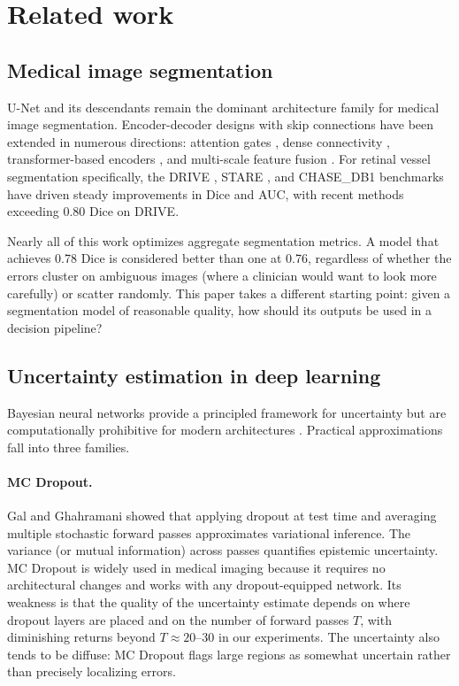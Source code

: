 \section{Related work}
\label{sec:related_work}

\subsection{Medical image segmentation}

U-Net \citep{ronneberger2015unet} and its descendants remain the dominant
architecture family for medical image segmentation. Encoder-decoder designs
with skip connections have been extended in numerous directions: attention
gates \citep{oktay2018attention}, dense connectivity \citep{li2018hdenseunet},
transformer-based encoders \citep{chen2021transunet}, and multi-scale feature
fusion \citep{zhou2018unetplusplus}. For retinal vessel segmentation
specifically, the DRIVE \citep{staal2004drive}, STARE \citep{hoover2000stare},
and CHASE\_DB1 \citep{fraz2012chase} benchmarks have driven steady
improvements in Dice and AUC, with recent methods exceeding 0.80 Dice on DRIVE.

Nearly all of this work optimizes aggregate segmentation metrics. A model
that achieves 0.78 Dice is considered better than one at 0.76, regardless of
whether the errors cluster on ambiguous images (where a clinician would want
to look more carefully) or scatter randomly. This paper takes a different
starting point: given a segmentation model of reasonable quality, how should
its outputs be used in a decision pipeline?

\subsection{Uncertainty estimation in deep learning}

Bayesian neural networks provide a principled framework for uncertainty but are
computationally prohibitive for modern architectures \citep{neal1996bayesian,
blundell2015weight}. Practical approximations fall into three families.

\paragraph{MC Dropout.} Gal and Ghahramani \citep{gal2016dropout} showed that
applying dropout at test time and averaging multiple stochastic forward passes
approximates variational inference. The variance (or mutual information) across
passes quantifies epistemic uncertainty. MC Dropout is widely used in medical
imaging \citep{nair2020exploring,jungo2018effect,roy2019bayesian} because it
requires no architectural changes and works with any dropout-equipped network.
Its weakness is that the quality of the uncertainty estimate depends on
where dropout layers are placed and on the number of forward passes $T$, with
diminishing returns beyond $T \approx 20$--30 in our experiments. The
uncertainty also tends to be diffuse: MC Dropout flags large regions as
somewhat uncertain rather than precisely localizing errors.

